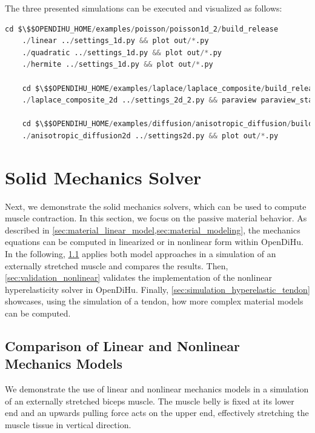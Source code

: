 \begin{reproduce_no_break}
  The three presented simulations can be executed and visualized as follows:
  \begin{lstlisting}[columns=fullflexible,breaklines=true,postbreak=\mbox{\textcolor{gray}{$\hookrightarrow$}\space},language=python]
    cd $\$$OPENDIHU_HOME/examples/poisson/poisson1d_2/build_release
    ./linear ../settings_1d.py && plot out/*.py
    ./quadratic ../settings_1d.py && plot out/*.py
    ./hermite ../settings_1d.py && plot out/*.py

    cd $\$$OPENDIHU_HOME/examples/laplace/laplace_composite/build_release/
    ./laplace_composite_2d ../settings_2d_2.py && paraview paraview_state.pvsm

    cd $\$$OPENDIHU_HOME/examples/diffusion/anisotropic_diffusion/build_release
    ./anisotropic_diffusion2d ../settings2d.py && plot out/*.py
  \end{lstlisting}
\end{reproduce_no_break}

\section{Solid Mechanics Solver}\label{sec:solver_solid_mechanics}

Next, we demonstrate the solid mechanics solvers, which can be used to compute muscle contraction. In this section, we focus on the passive material behavior.
As described in \cref{sec:material_linear_model,sec:material_modeling}, the mechanics equations can be computed in linearized or in nonlinear form within OpenDiHu.
In the following, \cref{sec:comparison_linear_nonlinear} applies both model approaches in a simulation of an externally stretched muscle and compares the results. Then, \cref{sec:validation_nonlinear} validates the implementation of the nonlinear hyperelasticity solver in OpenDiHu. Finally, \cref{sec:simulation_hyperelastic_tendon} showcases, using the simulation of a tendon, how more complex material models can be computed.

\subsection{Comparison of Linear and Nonlinear Mechanics Models}\label{sec:comparison_linear_nonlinear}

We demonstrate the use of linear and nonlinear mechanics models in a simulation of an externally stretched biceps muscle. The muscle belly is fixed at its lower end and an upwards pulling force acts on the upper end, effectively stretching the muscle tissue in vertical direction.

